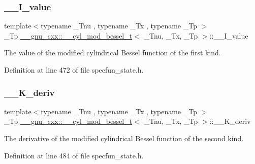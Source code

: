 \subsubsection{\texorpdfstring{\+\_\+\+\_\+\+I\+\_\+value}{\_\_I\_value}}
{\footnotesize\ttfamily template$<$typename \+\_\+\+Tnu , typename \+\_\+\+Tx , typename \+\_\+\+Tp $>$ \\
\+\_\+\+Tp \hyperlink{struct____gnu__cxx_1_1____cyl__mod__bessel__t}{\+\_\+\+\_\+gnu\+\_\+cxx\+::\+\_\+\+\_\+cyl\+\_\+mod\+\_\+bessel\+\_\+t}$<$ \+\_\+\+Tnu, \+\_\+\+Tx, \+\_\+\+Tp $>$\+::\+\_\+\+\_\+\+I\+\_\+value}



The value of the modified cylindrical Bessel function of the first kind. 



Definition at line 472 of file specfun\+\_\+state.\+h.

\mbox{\label{struct____gnu__cxx_1_1____cyl__mod__bessel__t_a8f86a11fb265db76743d80e98be389be}} 
\subsubsection{\texorpdfstring{\+\_\+\+\_\+\+K\+\_\+deriv}{\_\_K\_deriv}}
{\footnotesize\ttfamily template$<$typename \+\_\+\+Tnu , typename \+\_\+\+Tx , typename \+\_\+\+Tp $>$ \\
\+\_\+\+Tp \hyperlink{struct____gnu__cxx_1_1____cyl__mod__bessel__t}{\+\_\+\+\_\+gnu\+\_\+cxx\+::\+\_\+\+\_\+cyl\+\_\+mod\+\_\+bessel\+\_\+t}$<$ \+\_\+\+Tnu, \+\_\+\+Tx, \+\_\+\+Tp $>$\+::\+\_\+\+\_\+\+K\+\_\+deriv}



The derivative of the modified cylindrical Bessel function of the second kind. 



Definition at line 484 of file specfun\+\_\+state.\+h.

\mbox{\label{struct____gnu__cxx_1_1____cyl__mod__bessel__t_a481e4c4537583c461654405c01c25566}} 
